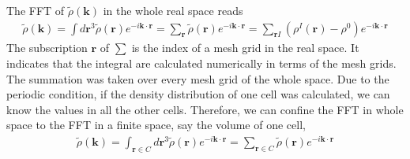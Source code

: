 \documentclass{article}
\begin{document}
The FFT of $\tilde{\rho}(\mathbf{k})$ in the whole real space reads
\begin{align}
  \tilde{\rho}(\mathbf{k})
  =\int d\mathbf{r}^3 \tilde{\rho}(\mathbf{r}) e^{-i\mathbf{k}\cdot\mathbf{r}}
  =\sum_{\mathbf{r}} \tilde{\rho}(\mathbf{r})
  e^{-i\mathbf{k}\cdot \mathbf{r}}
  =\sum_{\mathbf{r} I}(\rho^I(\mathbf{r}) - \rho^0)
  e^{-i\mathbf{k}\cdot \mathbf{r}}
  \label{}
\end{align}
The subscription $\mathbf{r}$ of $\sum$ is the index of a mesh grid in
the real space.  It indicates that the integral are calculated numerically in
terms of the mesh grids.
The summation was taken over every mesh grid of the whole space.
Due to the periodic condition,
if the density distribution of one cell was calculated,
we can know the values in all the other cells.
Therefore, we can confine the FFT in whole space to the FFT in a finite space,
say the volume of one cell,
\begin{align}
  \tilde{\rho}(\mathbf{k})
  =\int_{\mathbf{r}\in C} d\mathbf{r}^3
  \tilde{\rho}(\mathbf{r}) e^{-i\mathbf{k}\cdot\mathbf{r}}
  =\sum_{\mathbf{r}\in C}
  \tilde{\rho}(\mathbf{r}) e^{-i\mathbf{k}\cdot \mathbf{r}}
  \label{}
\end{align}
\end{document}
